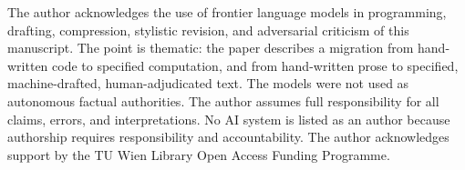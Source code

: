\documentclass[
  aps,
  reprint,
  superscriptaddress,
  floatfix,
  nofootinbib,
  longbibliography
]{revtex4-2}
\begin{document}
\begin{acknowledgments}
The author acknowledges the use of frontier language models in programming,
drafting, compression, stylistic revision, and adversarial criticism of this
manuscript. The point is thematic: the paper describes a migration from
hand-written code to specified computation, and from hand-written prose to
specified, machine-drafted, human-adjudicated text. The models were not used as
autonomous factual authorities. The author assumes full responsibility for all
claims, errors, and interpretations. No AI system is listed as an author because
authorship requires responsibility and accountability. The author acknowledges
support by the TU Wien Library Open Access Funding Programme.
\end{acknowledgments}


\end{document}
